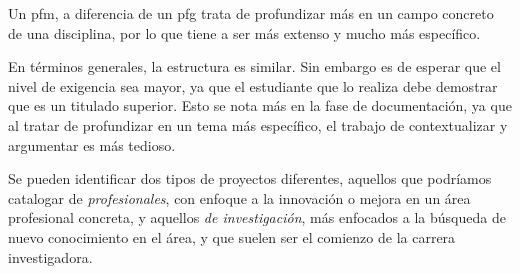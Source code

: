 Un \gls{pfm}, a diferencia de un \gls{pfg} trata de profundizar más en un campo concreto de una disciplina, por lo que tiene a ser más extenso y mucho más específico.

En términos generales, la estructura es similar. Sin embargo es de esperar que el nivel de exigencia sea mayor, ya que el estudiante que lo realiza debe demostrar que es un titulado superior. Esto se nota más en la fase de documentación, ya que al tratar de profundizar en un tema más específico, el trabajo de contextualizar y argumentar es más tedioso.

Se pueden identificar dos tipos de proyectos diferentes, aquellos que podríamos catalogar de \textit{profesionales}, con enfoque a la innovación o mejora en un área profesional concreta, y aquellos \textit{de investigación}, más enfocados a la búsqueda de nuevo conocimiento en el área, y que suelen ser el comienzo de la carrera investigadora.
